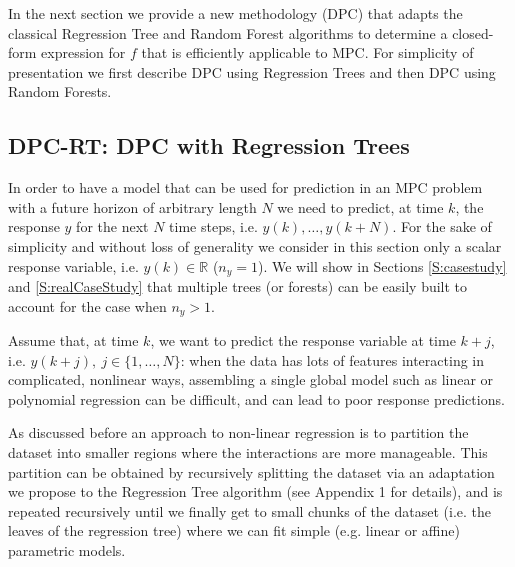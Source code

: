 \textcolor[rgb]{0,0,1}{In the next section we provide a new methodology (DPC) that adapts the classical Regression Tree and Random Forest algorithms to determine a closed-form expression for $f$ that is efficiently applicable to MPC. For simplicity of presentation we first describe DPC using Regression Trees and then DPC using Random Forests.}





\subsection{DPC-RT: DPC with Regression Trees}

\label{SS:dpcrt}

\textcolor[rgb]{0,0,1}{In order to have a model that can be used for prediction in an MPC problem with a future horizon of arbitrary length $N$	 we need to predict, at time $k$, the response $y$ for the next $N$ time steps, i.e. $y(k),\ldots,y(k+N)$. For the sake of simplicity and without loss of generality we consider in this section only a scalar response variable, i.e. $y(k)\in\mathbb{R}$ ($n_y = 1$). We will show in Sections \ref{S:casestudy} and \ref{S:realCaseStudy} that multiple trees (or forests) can be easily built to account for the case when $n_y > 1$.}

\textcolor[rgb]{0,0,1}{Assume that, at time $k$, we want to predict the response variable at time $k+j$, i.e. $y(k+j),\ j\in \{1,\ldots,N\}$: when the data has lots of features interacting in complicated, nonlinear ways, assembling a single global model such as linear or polynomial regression can be difficult, and can lead to poor response predictions.}

\textcolor[rgb]{0,0,1}{As discussed before an approach to non-linear regression is to partition the dataset into smaller regions where the interactions are more manageable. This partition can be obtained by recursively splitting the dataset via an adaptation we propose to the Regression Tree algorithm (see Appendix 1 for details), and is repeated recursively until we finally get to small chunks of the dataset (i.e. the leaves of the regression tree) where we can fit simple (e.g. linear or affine) parametric models.}


